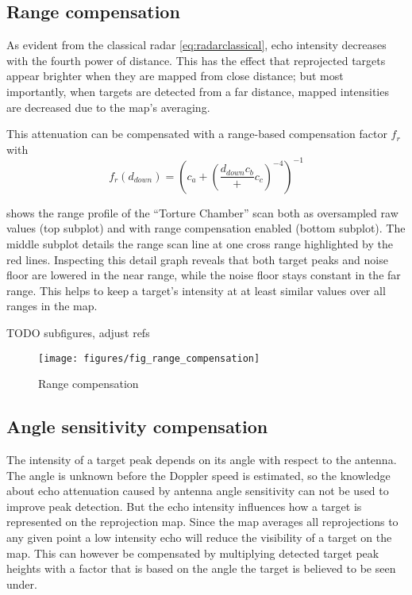 \subsection{Range compensation}\label{range-compensation}

As evident from the classical radar \cref{eq:radarclassical}, echo intensity decreases with
the fourth power of distance. This has the effect that reprojected
targets appear brighter when they are mapped from close distance; but
most importantly, when targets are detected from a far distance, mapped
intensities are decreased due to the map's averaging.

This attenuation can be compensated with a range-based compensation
factor \(f_r\) with \[f_r(d_{down}) = {
\left(
c_a + (
\frac{{d_{down}}{c_b}}
+ c_c)^{-4}
\right) ^ {-1}
}\]


 shows the range profile of the ``Torture Chamber'' scan
both as oversampled raw values (top subplot) and with range compensation
enabled (bottom subplot). The middle subplot details the range scan line
at one cross range highlighted by the red lines. Inspecting this detail
graph reveals that both target peaks and noise floor are lowered in the
near range, while the noise floor stays constant in the far range. This
helps to keep a target's intensity at at least similar values over all
ranges in the map.

TODO subfigures, adjust refs
\begin{figure}[htbp]
    \centering
    \texttt{[image: figures/fig\_range\_compensation]}
    \caption{Range compensation}
    \label{fig:fig_range_compensation}
\end{figure}

\subsection{Angle sensitivity compensation}\label{angle-sensitivity-compensation}

The intensity of a target peak depends on its angle with respect to the
antenna. The angle is unknown before the Doppler speed is estimated, so
the knowledge about echo attenuation caused by antenna angle sensitivity
can not be used to improve peak detection. But the echo intensity
influences how a target is represented on the reprojection map. Since
the map averages all reprojections to any given point a low intensity
echo will reduce the visibility of a target on the map. This can however
be compensated by multiplying detected target peak heights with a factor
that is based on the angle the target is believed to be seen under.

